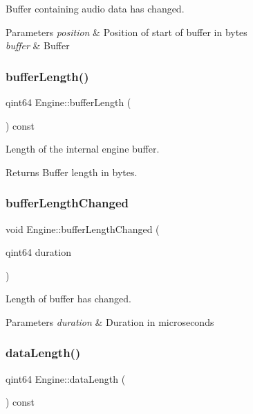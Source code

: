 Buffer containing audio data has changed. 
\begin{DoxyParams}{Parameters}
{\em position} & Position of start of buffer in bytes \\
\hline
{\em buffer} & Buffer \\
\hline
\end{DoxyParams}
\hypertarget{class_engine_a1e21c3b6d92bfa97d8ad77ce67f28264}{}\label{class_engine_a1e21c3b6d92bfa97d8ad77ce67f28264} 
\subsubsection{\texorpdfstring{buffer\+Length()}{bufferLength()}}
{\footnotesize\ttfamily qint64 Engine\+::buffer\+Length (\begin{DoxyParamCaption}{ }\end{DoxyParamCaption}) const}

Length of the internal engine buffer. \begin{DoxyReturn}{Returns}
Buffer length in bytes. 
\end{DoxyReturn}
\hypertarget{class_engine_a3870ec1ab9c7ee50a8126ffb5a2dbb04}{}\label{class_engine_a3870ec1ab9c7ee50a8126ffb5a2dbb04} 
\subsubsection{\texorpdfstring{buffer\+Length\+Changed}{bufferLengthChanged}}
{\footnotesize\ttfamily void Engine\+::buffer\+Length\+Changed (\begin{DoxyParamCaption}\item[{qint64}]{duration }\end{DoxyParamCaption})\hspace{0.3cm}{\ttfamily [signal]}}

Length of buffer has changed. 
\begin{DoxyParams}{Parameters}
{\em duration} & Duration in microseconds \\
\hline
\end{DoxyParams}
\hypertarget{class_engine_a046bdd2d3c60411e1c08253bb1af28df}{}\label{class_engine_a046bdd2d3c60411e1c08253bb1af28df} 
\subsubsection{\texorpdfstring{data\+Length()}{dataLength()}}
{\footnotesize\ttfamily qint64 Engine\+::data\+Length (\begin{DoxyParamCaption}{ }\end{DoxyParamCaption}) const\hspace{0.3cm}{\ttfamily [inline]}}

